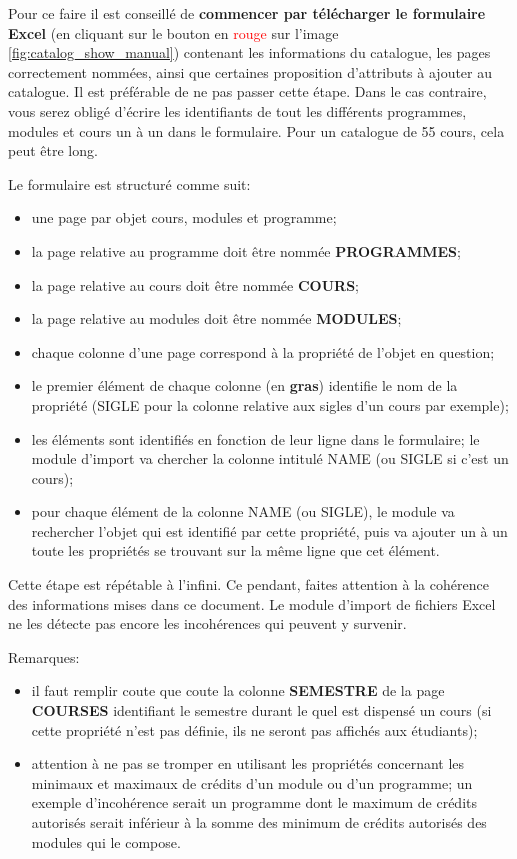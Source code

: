  


Pour ce faire il est conseillé  de \textbf{commencer par télécharger le formulaire Excel} (en cliquant sur le bouton en \textcolor{red}{rouge} sur l'image \ref{fig:catalog_show_manual}) contenant les informations du catalogue, les pages correctement nommées, ainsi que certaines proposition d'attributs à ajouter au catalogue. Il est préférable de ne pas passer cette étape. Dans le cas contraire, vous serez obligé d'écrire les identifiants de tout les différents programmes, modules et cours un à un dans le formulaire. Pour un catalogue de 55 cours, cela peut être long. 

Le formulaire est structuré comme suit:
\begin{itemize}
\item une page par objet cours, modules et programme;
\item la page relative au programme doit être nommée \textbf{PROGRAMMES};
\item la page relative au cours doit être nommée \textbf{COURS};
\item la page relative au modules doit être nommée \textbf{MODULES};
\item chaque colonne d'une page correspond à la propriété de l'objet en question;
\item le premier élément de chaque colonne (en \textbf{gras}) identifie le nom de la propriété (SIGLE pour la colonne relative aux sigles d'un cours par exemple);
\item les éléments sont identifiés en fonction de leur ligne dans le formulaire; le module d'import va chercher la colonne intitulé NAME (ou SIGLE si c'est un cours);
\item pour chaque élément de la colonne NAME (ou SIGLE), le module va rechercher l'objet qui est identifié par cette propriété, puis va ajouter un à un toute les propriétés se trouvant sur la même ligne que cet élément. 
\end{itemize}

Cette étape est répétable à l’infini. Ce pendant, faites attention à la cohérence des informations mises dans ce document. Le module d'import de fichiers Excel ne les détecte pas encore les incohérences qui peuvent y survenir. 

Remarques:
\begin{itemize}
\item il faut remplir coute que coute la colonne \textbf{SEMESTRE} de la page \textbf{COURSES} identifiant le semestre durant le quel est dispensé un cours (si cette propriété n'est pas définie, ils ne seront pas affichés aux étudiants);
\item attention à ne pas se tromper en utilisant les propriétés concernant les minimaux et maximaux de crédits d'un module ou d'un programme; un exemple d'incohérence serait un programme dont le maximum de crédits autorisés serait inférieur à la somme des minimum de crédits autorisés des modules qui le compose.
\end{itemize}



